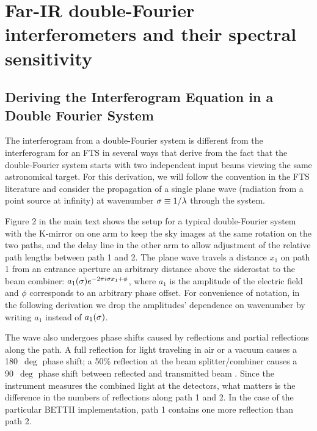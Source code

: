 
\chapter{Far-IR double-Fourier interferometers and their spectral sensitivity} %

\label{AppendixA} %

\section{Deriving the Interferogram Equation in a Double Fourier System}
\label{ap:interfero}
The interferogram from a double-Fourier system is different from the interferogram
for an FTS in several ways that derive from the fact
that the double-Fourier system starts with two independent input beams viewing the same astronomical target. For this derivation,
we will follow the convention in the FTS literature and consider the propagation of a single plane wave (radiation from a point source at infinity) at wavenumber $\sigma\equiv{1/\lambda}$ through the system.

Figure 2 in the main text shows the setup for a typical double-Fourier system with the K-mirror on one
arm to keep the sky images at the same rotation on the two paths, and the delay line
in the other arm to allow adjustment of the relative path lengths between path 1 and 2.
The plane wave travels a distance $x_1$ on path 1 from an entrance aperture an arbitrary distance
above the siderostat to the beam combiner: $a_1(\sigma) e^{-2\pi i \sigma x_1+\phi}$,
where $a_1$ is the amplitude of the electric field and $\phi$ corresponds to an arbitrary phase offset. For convenience of notation, in the following derivation we drop the amplitudes' dependence on wavenumber by writing $a_1$ instead of $a_1(\sigma)$.

The wave also undergoes phase shifts caused by reflections and partial reflections along
the path. A full reflection for light traveling in air or a vacuum causes a 180~$\deg$ phase shift;
a 50\% reflection at the beam splitter/combiner causes a 90~$\deg$ phase shift between reflected and transmitted beam \citep{Lawson:2000vf}. Since the instrument
measures the combined light at the detectors, what matters is the difference in the
numbers of reflections along path 1 and 2. In the case of the particular BETTII implementation, path 1 contains one more reflection than path 2.

